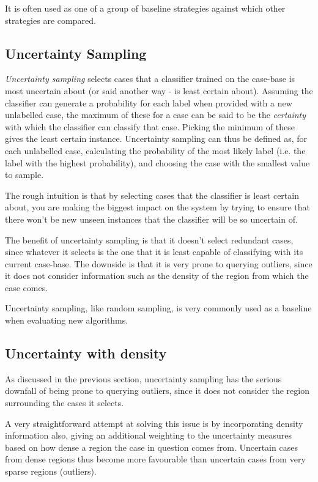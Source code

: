 \documentclass[a4paper,11pt]{report}
\begin{document}
It is often used as one of a group of baseline strategies against which other strategies are compared.

\subsection{Uncertainty Sampling}
\emph{Uncertainty sampling} \citep{Lewis1994} selects cases that a classifier trained on the case-base is most uncertain about (or said another way - is least certain about). Assuming the classifier can generate a probability for each label when provided with a new unlabelled case, the maximum of these for a case can be said to be the \emph{certainty} with which the classifier can classify that case. Picking the minimum of these gives the least certain instance. Uncertainty sampling can thus be defined as, for each unlabelled case, calculating the probability of the most likely label (i.e. the label with the highest probability), and choosing the case with the smallest value to sample.

The rough intuition is that by selecting cases that the classifier is least certain about, you are making the biggest impact on the system by trying to ensure that there won't be new unseen instances that the classifier will be so uncertain of.

The benefit of uncertainty sampling is that it doesn't select redundant cases, since whatever it selects is the one that it is least capable of classifying with its current case-base. The downside is that it is very prone to querying outliers, since it does not consider information such as the density of the region from which the case comes.

Uncertainty sampling, like random sampling, is very commonly used as a baseline when evaluating new algorithms.

\subsection{Uncertainty with density}
As discussed in the previous section, uncertainty sampling has the serious downfall of being prone to querying outliers, since it does not consider the region surrounding the cases it selects.

A very straightforward attempt at solving this issue is by incorporating density information also, giving an additional weighting to the uncertainty measures based on how dense a region the case in question comes from. Uncertain cases from dense regions thus become more favourable than uncertain cases from very sparse regions (outliers).
\end{document}
